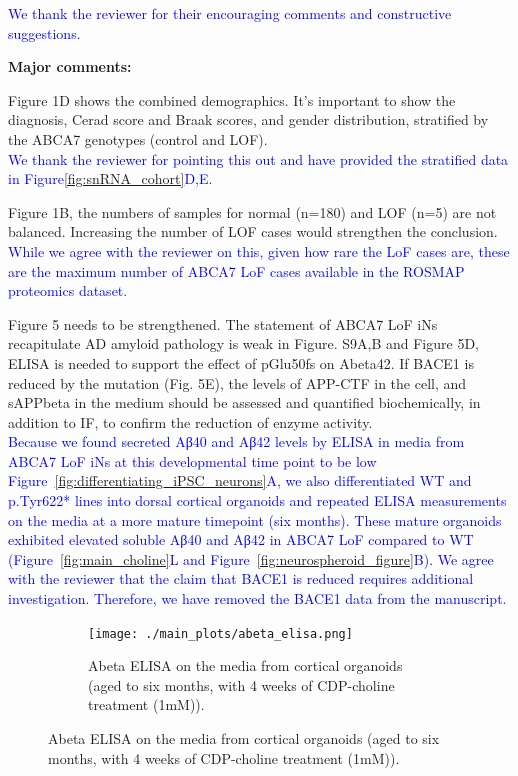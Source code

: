 \documentclass[12pt]{article}
\begin{document}
\textcolor{blue}{We thank the reviewer for their encouraging comments and constructive suggestions.}

\textbf{Major comments:}

Figure 1D shows the combined demographics. It’s important to show the diagnosis, Cerad score and Braak scores, and gender distribution, stratified by the ABCA7 genotypes (control and LOF).\\
\textcolor{blue}{We thank the reviewer for pointing this out and have provided the stratified data in Figure\ref{fig:snRNA_cohort}D,E.}

Figure 1B, the numbers of samples for normal (n=180) and LOF (n=5) are not balanced. Increasing the number of LOF cases would strengthen the conclusion.\\
\textcolor{blue}{While we agree with the reviewer on this, given how rare the LoF cases are, these are the maximum number of ABCA7 LoF cases available in the ROSMAP proteomics dataset.}

Figure 5 needs to be strengthened. The statement of ABCA7 LoF iNs recapitulate AD amyloid pathology is weak in Figure. S9A,B and Figure 5D, ELISA is needed to support the effect of pGlu50fs on Abeta42. If BACE1 is reduced by the mutation (Fig. 5E), the levels of APP-CTF in the cell, and sAPPbeta in the medium should be assessed and quantified biochemically, in addition to IF, to confirm the reduction of enzyme activity.\\
\textcolor{blue}{Because we found secreted Aβ40 and Aβ42 levels by ELISA in media from ABCA7 LoF iNs at this developmental time point to be low Figure~\ref{fig:differentiating_iPSC_neurons}A, we also differentiated WT and p.Tyr622* lines into dorsal cortical organoids and repeated ELISA measurements on the media at a more mature timepoint (six months). These mature organoids exhibited elevated soluble Aβ40 and Aβ42 in ABCA7 LoF compared to WT (Figure~\ref{fig:main_choline}L and Figure~\ref{fig:neurospheroid_figure}B). We agree with the reviewer that the claim that BACE1 is reduced requires additional investigation. Therefore, we have removed the BACE1 data from the manuscript.}

\begin{figure}[H] 
	\centering
	\begin{subfigure}[t]{.6\textwidth}
		\caption{Abeta ELISA on the media from cortical organoids (aged to six months, with 4 weeks of CDP-choline treatment (1mM)).}
		\texttt{[image: ./main\_plots/abeta\_elisa.png]}        
	\end{subfigure}  
\end{figure}
\end{document}
